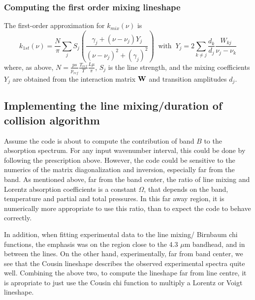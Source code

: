 \documentclass[11pt]{article}
\begin{document}
\subsubsection{Computing the first order mixing lineshape}
The first-order approximation for $k_{mix}(\nu)$ is
\[
k_{1st}(\nu)=\frac{N}{\pi}\sum_{j} S_{j}
\left(\frac{ \gamma_{j}+ 
(\nu-\nu_{j})Y_{j}}{(\nu-\nu_{j})^{2}+(\gamma_{j})^{2}}\right)
\; \; \mbox{with} \; \; 
Y_j=2\sum_{k\neq j}\frac{d_k}{d_j}\frac{W_{kj}}{\nu_j-\nu_k}
\]
where, as above, $N = \frac{ps}{p_{ref}} \frac{T_{ref}}{T} 
\frac{L\mu}{\pi}$, $S_{j}$ is the line strength, and the mixing coefficients
$Y_{j}$ are obtained from the interaction matrix ${\bf W}$ and transition
amplitudes $d_{j}$.

\subsection{Implementing the line mixing/duration of collision algorithm}
Assume the code is about to compute the contribution of band $B$ to the 
absorption spectrum. For any input wavenumber interval, this could be done 
by following the prescription above. However, the code could be sensitive to 
the numerics of the matrix diagonalization and inversion, especially far from 
the band. As mentioned above, far from the band center, the ratio of line 
mixing and Lorentz absorption coefficients is a constant $\Omega$, that 
depends on the band, temperature and partial and total pressures. In this far 
away region, it is numerically more appropriate to use this ratio, than to 
expect the code to behave correctly. 

In addition, when fitting experimental data to the line mixing/ Birnbaum chi 
functions, the emphasis was on the region close to the 4.3 $\mu$m bandhead,
and in between the lines. On the other hand, experimentally, far from band 
center, we see that the Cousin lineshape describes the observed experimental 
spectra quite well. Combining the above two, to compute the lineshape far
from line centre, it is apropriate to just use the Cousin chi function to 
multiply a Lorentz or Voigt lineshape. 
\end{document}

